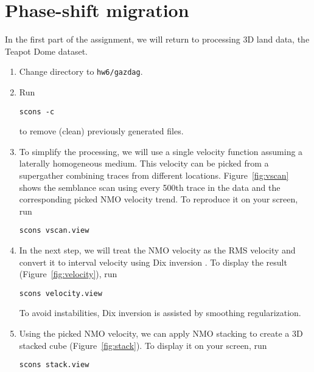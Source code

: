 \section{Phase-shift migration}

In the first part of the assignment, we will return to processing 3D land data, the Teapot Dome dataset.

\begin{enumerate}

\item Change directory to \texttt{hw6/gazdag}.
\item Run
\begin{verbatim}
scons -c
\end{verbatim}
to remove (clean) previously generated files.

\item To simplify the processing, we will use a single velocity function assuming a laterally homogeneous medium. This velocity can be picked from a supergather combining traces from different locations. Figure~\ref{fig:vscan} shows the semblance scan using every 500th trace in the data and the corresponding picked NMO velocity trend. To reproduce it on your screen, run
\begin{verbatim}
scons vscan.view
\end{verbatim}



\item In the next step, we will treat the NMO velocity as the RMS velocity and convert it to interval velocity using Dix inversion \cite[]{GEO20-01-00680086}. To display the result (Figure~\ref{fig:velocity}), run
\begin{verbatim}
scons velocity.view
\end{verbatim}
To avoid instabilities, Dix inversion is assisted by smoothing regularization.
\item Using the picked NMO velocity, we can apply NMO stacking to create a 3D stacked cube (Figure~\ref{fig:stack}). To display it on your screen, run
\begin{verbatim}
scons stack.view
\end{verbatim}


\end{enumerate}
